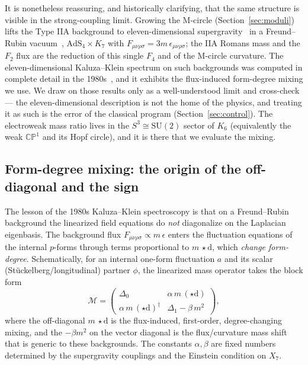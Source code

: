 \documentclass[11pt]{article}
\theoremstyle{plain}
\theoremstyle{definition}
\newcommand{\cM}{\mathcal{M}}
\newcommand{\dd}{\mathrm{d}}
\newcommand{\SU}{\mathrm{SU}}
\newcommand{\AdS}{\mathrm{AdS}}
\begin{document}
It is nonetheless reassuring, and historically clarifying, that the same
structure is visible in the strong-coupling limit. Growing the M-circle
(Section~\ref{sec:moduli}) lifts the Type IIA background to eleven-dimensional
supergravity~\cite{CremmerJuliaScherk1978} in a Freund--Rubin
vacuum~\cite{FreundRubin1980}, $\AdS_4\times K_7$ with
$F_{\mu\nu\rho\sigma}=3m\,\epsilon_{\mu\nu\rho\sigma}$; the IIA Romans mass
and the $F_2$ flux are the reduction of this single $F_4$ and of the
M-circle curvature. The eleven-dimensional Kaluza--Klein spectrum on such
backgrounds was computed in complete detail in the
1980s~\cite{DuffNilssonPope1986,CasherEnglertNicolaiRooman1984,Englert1982},
and it exhibits the flux-induced form-degree mixing we use. We draw
on those results only as a well-understood limit and cross-check --- the
eleven-dimensional description is not the home of the physics, and treating it
as such is the error of the classical program (Section~\ref{sec:control}).
The electroweak mass ratio lives in the $S^3\cong\SU(2)$ sector of $K_6$
(equivalently the weak $\mathbb{CP}^1$ and its Hopf circle), and it is there
that we evaluate the mixing.

\subsection{Form-degree mixing: the origin of the off-diagonal and the sign}

The lesson of the 1980s Kaluza--Klein spectroscopy
\cite{DuffNilssonPope1986,CasherEnglertNicolaiRooman1984,Englert1982} is
that on a Freund--Rubin background the linearized field equations do
\emph{not} diagonalize on the Laplacian eigenbasis. The background flux
$F_{\mu\nu\rho\sigma}\propto m\,\epsilon$ enters the fluctuation equations
of the internal $p$-forms through terms proportional to $m\,\star\dd$, which
\emph{change form-degree}. Schematically, for an internal one-form
fluctuation $a$ and its scalar (Stückelberg/longitudinal) partner $\phi$,
the linearized mass operator takes the block form
\begin{equation}
\cM=
\begin{pmatrix}
\Delta_0 & \alpha\, m\,(\star\dd)\\[1mm]
\alpha\, m\,(\star\dd)^{\dagger} & \Delta_1-\beta\,m^2
\end{pmatrix},
\label{eq:fluxblock}
\end{equation}
where the off-diagonal $m\,\star\dd$ is the flux-induced, first-order,
degree-changing mixing, and the $-\beta m^2$ on the vector diagonal is the
flux/curvature mass shift that is generic to these backgrounds. The
constants $\alpha,\beta$ are fixed numbers determined by the supergravity
couplings and the Einstein condition on $X_7$.
\end{document}
